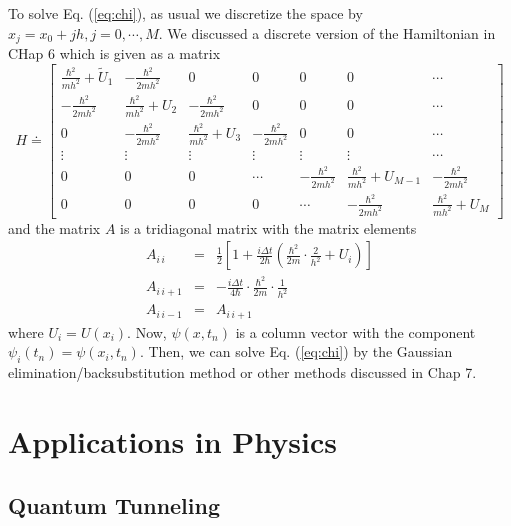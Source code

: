 To solve Eq. (\ref{eq:chi}), as usual we discretize the space by $x_j=x_0+j h, j=0, \cdots, M$.  We discussed a discrete version of the Hamiltonian in CHap 6 which is given as a matrix
\begin{equation}
H \doteq  \begin{bmatrix}
 \frac{\hbar^2 }{m h^2}+ \tilde{U}_1 & -\frac{\hbar^2}{2 m h^2} & 0 & 0 & 0 & 0 &\cdots \\
 -\frac{\hbar^2}{2 m h^2} &  \frac{\hbar^2 }{m h^2}+ U_2 &-\frac{\hbar^2}{2 m h^2} & 0 & 0& 0&\cdots \\
 0 & -\frac{\hbar^2}{2 m h^2} &  \frac{\hbar^2 }{m h^2}+ U_3 &-\frac{\hbar^2}{2 m h^2} & 0 & 0 & \cdots \\
 \vdots & \vdots & \vdots & \vdots &\vdots  & \vdots  & \cdots\\
  0 & 0 & 0 & \cdots  & -\frac{\hbar^2}{2 m h^2}&  \frac{\hbar^2 }{m h^2}+ U_{M-1} & -\frac{\hbar^2}{2 m h^2} \\
 0 & 0 & 0 &0 & \cdots & -\frac{\hbar^2}{2 m h^2} &  \frac{\hbar^2 }{m h^2}+ U_M
 \end{bmatrix} 
\end{equation}
and the matrix $A$ is a tridiagonal matrix with the matrix elements
\begin{subequations}
\begin{eqnarray}
A_{i\,i} &=& \frac{1}{2} \left [ 1 + \frac{i\Delta t}{2\hbar} \left ( \frac{\hbar^2}{2m} \cdot \frac{2}{h^2}+ U_i \right ) \right ] \\
A_{i\, i+1}&=& -\frac{i\Delta t}{4 \hbar}  \cdot\frac{\hbar^2}{2m}  \cdot\frac{1}{h^2} \\
A_{i\, i-1}&=&A_{i\, i+1}
\end{eqnarray}
\end{subequations}
where $U_i=U(x_i)$.  Now, $\psi(x,t_n)$ is a column vector with the component $\psi_i(t_n) = \psi(x_i, t_n)$.  Then, we can solve Eq. (\ref{eq:chi}) by the Gaussian elimination/backsubstitution method or other methods discussed in Chap 7.


\section{Applications in Physics}

\subsection{Quantum Tunneling}\label{ex:tunneling}

